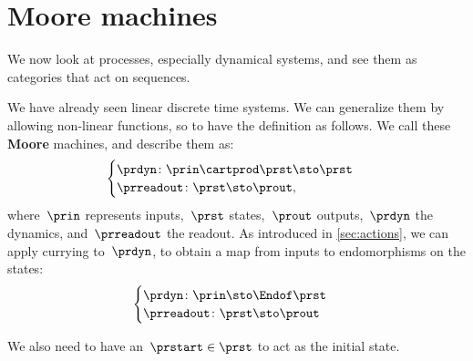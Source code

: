 

\section{Moore machines}
\label{sec:moore-machines}

We now look at processes, especially dynamical systems, and see them as categories that act on sequences.

We have already seen linear discrete time systems. We can generalize them by allowing non-linear functions, so to have
the definition as follows. We call these \textbf{Moore} machines, and describe them as:
\begin{equation}
    \label{eq:moore-1}
    \begin{cases}
        \prdyn \colon \prin \cartprod \prst \sto \prst \\
        \prreadout \colon \prst \sto \prout,
    \end{cases}
\end{equation}
where~$\prin$ represents inputs,~$\prst$ states,~$\prout$ outputs,~$\prdyn$ the dynamics, and~$\prreadout$ the readout.
As introduced in \cref{sec:actions}, we can apply currying to~$\prdyn$, to obtain a map from inputs to endomorphisms on the states:
\begin{equation}
    \label{eq:moore-1-endo}
    \begin{cases}
        \prdyn \colon \prin \sto \Endof \prst \\
        \prreadout \colon \prst \sto \prout
    \end{cases}
\end{equation}


We also need to have an~$\prstart \in \prst$ to act as the initial state.



